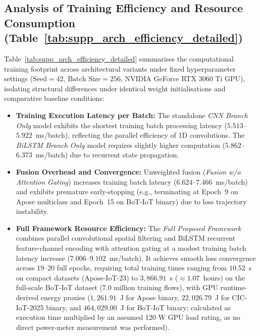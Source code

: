 \documentclass[a4paper,fleqn]{cas-sc}
\begin{document}
\subsection{Analysis of Training Efficiency and Resource Consumption (Table~\ref{tab:supp_arch_efficiency_detailed})}

Table~\ref{tab:supp_arch_efficiency_detailed} summarises the computational training footprint across architectural variants under fixed hyperparameter settings ($\text{Seed} = 42$, $\text{Batch Size} = 256$, NVIDIA GeForce RTX 3060 Ti GPU), isolating structural differences under identical weight initialisations and comparative baseline conditions:
\begin{itemize}
    \item \textbf{Training Execution Latency per Batch:} The standalone \textit{CNN Branch Only} model exhibits the shortest training batch processing latency ($5.513$--$5.922$~ms/batch), reflecting the parallel efficiency of 1D convolutions. The \textit{BiLSTM Branch Only} model requires slightly higher computation ($5.862$--$6.373$~ms/batch) due to recurrent state propagation.
    \item \textbf{Fusion Overhead and Convergence:} Unweighted fusion (\textit{Fusion w/o Attention Gating}) increases training batch latency ($6.624$--$7.466$~ms/batch) and exhibits premature early-stopping (e.g., terminating at Epoch~9 on Apose multiclass and Epoch~15 on BoT-IoT binary) due to loss trajectory instability.
    \item \textbf{Full Framework Resource Efficiency:} The \textit{Full Proposed Framework} combines parallel convolutional spatial filtering and BiLSTM recurrent feature-channel encoding with attention gating at a modest training batch latency increase ($7.006$--$9.102$~ms/batch). It achieves smooth loss convergence across 19--20 full epochs, requiring total training times ranging from $10.52$~s on compact datasets (Apose-IoT-23) to $3,866.91$~s ($\approx 1.07$~hours) on the full-scale BoT-IoT dataset (7.0 million training flows), with GPU runtime-derived energy proxies ($1,261.91$~J for Apose binary, $22,026.79$~J for CIC-IoT-2025 binary, and $464,029.00$~J for BoT-IoT binary; calculated as execution time multiplied by an assumed 120 W GPU load rating, as no direct power-meter measurement was performed).
\end{itemize}
\end{document}
